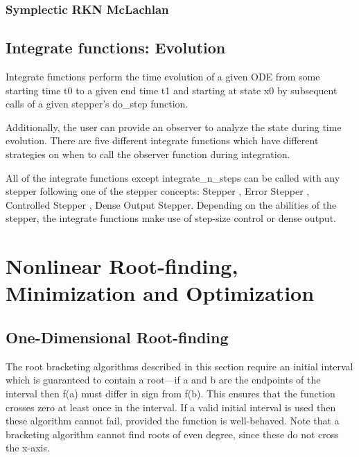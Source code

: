 \subsection{Symplectic RKN McLachlan}
\label{Symplectic RKN McLachlan}

\lipsum[2]


\section{Integrate functions: Evolution}
\label{EvolutionODE}

Integrate functions perform the time evolution of a given ODE from some starting time t0 to a given end time t1 and starting at state x0 by subsequent calls of a given stepper's do\_step function. 

Additionally, the user can provide an observer to analyze the state during time evolution. There are five different integrate functions which have different strategies on when to call the observer function during integration. 

All of the integrate functions except integrate\_n\_steps can be called with any stepper following one of the stepper concepts: Stepper , Error Stepper , Controlled Stepper , Dense Output Stepper. Depending on the abilities of the stepper, the integrate functions make use of step-size control or dense output. 








\chapter{Nonlinear Root-finding, Minimization and Optimization}
\label{NonlinearOptimization} %



\section{One-Dimensional Root-finding}
\label{OneDimensionalRootfinding}

The root bracketing algorithms described in this section require an initial interval which is
guaranteed to contain a root—if a and b are the endpoints of the interval then f(a) must
differ in sign from f(b). This ensures that the function crosses zero at least once in the
interval. If a valid initial interval is used then these algorithm cannot fail, provided the
function is well-behaved.
Note that a bracketing algorithm cannot find roots of even degree, since these do not
cross the x-axis.


